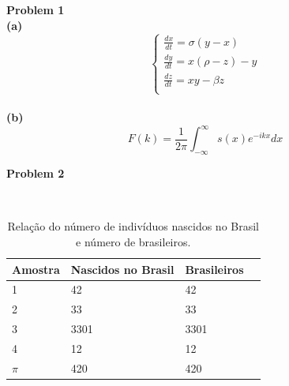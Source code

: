 \documentclass[12pt]{abntex2}
\begin{document}
\textbf{Problem 1}
\\
\textbf{(a)}\\
\begin{equation}
		\left\{\begin{array}{l}
		\frac{dx}{dt} = \sigma(y-x)\\
		\frac{dy}{dt} = x(\rho-z) - y\\
		\frac{dz}{dt} = xy - \beta z\\
		\end{array}
		\right.
\end{equation}
\\
\textbf{(b)}\\
\begin{equation}
F(k) = \frac{1}{2\pi}\int_{-\infty}^{\infty}s(x)e^{-ikx}dx
\end{equation}

\textbf{Problem 2}
\begin{table}[htb]
\\
\end{table}
\begin{table}[htb]
\begin{center}
\ABNTEXfontereduzida
\caption[2]{\label{tab:formal}Relação do número de indivíduos nascidos no Brasil e número de brasileiros.}
\begin{tabular}{m{4.0cm}|m{4.0cm}|m{2.25cm}|m{3.40cm}}
\hline
\textbf{Amostra} & \textbf{Nascidos no Brasil} & \textbf{Brasileiros}\\
\hline
1 & 42 & 42 \\
\hline
2 & 33 & 33 \\
\hline
3 & 3301 & 3301 \\
\hline
4 & 12 & 12 \\
\hline
$\pi$ & 420 & 420 \\
\hline
\end{tabular}
\end{center}
\end{table}
\end{document}
